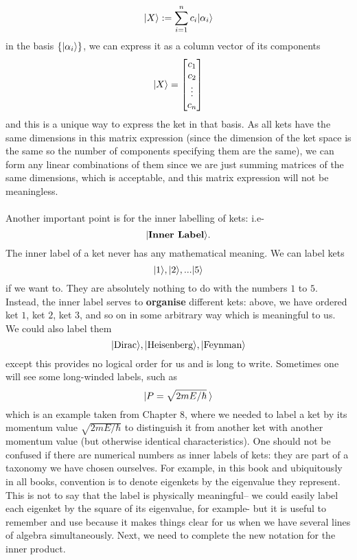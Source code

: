 $$
|X\rangle:=\sum_{i=1}^{n}c_{i}|\alpha_{i}\rangle
$$
in the basis $\{|\alpha_{i}\rangle\}$, we can express it as a column vector of its components
$$
|X\rangle=\begin{bmatrix}
c_{1}\\
c_{2}\\
\vdots\\
c_{n}\\
\end{bmatrix}
$$
and this is a unique way to express the ket in that basis. As all kets have the same dimensions in this matrix expression (since the dimension of the ket space is the same so the number of components specifying them are the same), we can form any linear combinations of them since we are just summing matrices of the same dimensions, which is acceptable, and this matrix expression will not be meaningless.
\\\\
Another important point is for the inner labelling of kets: i.e-
$$
|\textbf{Inner Label}\rangle.
$$
The inner label of a ket never has any mathematical meaning. We can label kets 
$$
|1\rangle, |2\rangle, ... |5\rangle
$$
if we want to. They are absolutely nothing to do with the numbers $1$ to $5$. Instead, the inner label serves to \textbf{organise} different kets: above, we have ordered ket $1$, ket $2$, ket $3$, and so on in some arbitrary way which is meaningful to us. We could also label them
$$
|\text{Dirac}\rangle, |\text{Heisenberg}\rangle, |\text{Feynman}\rangle
$$
except this provides no logical order for us and is long to write. Sometimes one will see some long-winded labels, such as 
$$
|P=\sqrt{{2mE}/{\hbar}}\:\rangle
$$
which is an example taken from Chapter 8, where we needed to label a ket by its momentum value $\sqrt{{2mE}/{\hbar}}$ to distinguish it from another ket with another momentum value (but otherwise identical characteristics). One should not be confused if there are numerical numbers as inner labels of kets: they are part of a taxonomy we have chosen ourselves. For example, in this book and ubiquitously in all books, convention is to denote eigenkets by the eigenvalue they represent. This is not to say that the label is physically meaningful-- we could easily label each eigenket by the square of its eigenvalue, for example- but it is useful to remember and use because it makes things clear for us when we have several lines of algebra simultaneously. Next, we need to complete the new notation for the inner product.
